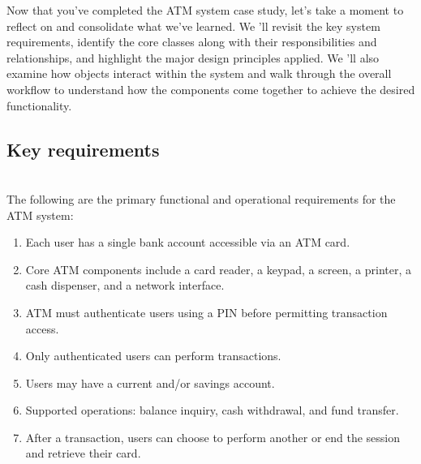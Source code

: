 

Now that you've completed the ATM system case study, let's take a moment to reflect on and consolidate what we've learned. We 'll revisit the key system requirements, identify the core classes along with their responsibilities and relationships, and highlight the major design principles applied. We
'll also examine how objects interact within the system and walk through the overall workflow to understand how the components come together to achieve the desired functionality.

\subsection{Key requirements}\label{d-IFMO2hF4b9ohX-Rt9JC}
\\
The following are the primary functional and operational requirements for the ATM system:

\begin{enumerate}
\item
\protect{}\label{ugBNWFHGRrK8AVec8PNyJ}
Each user has a single bank account accessible via an ATM card.
\item
\protect{}\label{gHbwiEC3YZmazRKMGBrSh}
Core ATM components include a card reader, a keypad, a screen, a printer, a cash dispenser, and a network interface.
\item
\protect{}\label{YSLCHjWZQPyIAg8XU5Hir}
ATM must authenticate users using a PIN before permitting transaction access.
\item
\protect{}\label{rh52im4qieitU6k52xMJl}
Only authenticated users can perform transactions.
\item
\protect{}\label{7ilNn4HoCcDtM8-jiy5x0}
Users may have a current and/or savings account.
\item
\protect{}\label{j30Ai8ylMJDaxTvMWS8df}
Supported operations: balance inquiry, cash withdrawal, and fund transfer.
\item
\protect{}\label{Th3AEQjhJvC-RV-xdEEtq}
After a transaction, users can choose to perform another or end the session and retrieve their card.
\end{enumerate}

